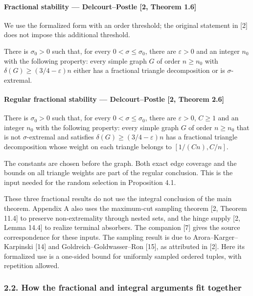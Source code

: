 \documentclass[english,11pt,a4paper]{article}
\begin{document}
\paragraph{Fractional stability --- Delcourt--Postle {[}2, Theorem 1.6{]}}\label{fractional-stability-delcourtpostle-2-theorem-1.6}

We use the formalized form with an order threshold; the original statement in {[}2{]} does not impose this additional threshold.

There is \(\sigma_0>0\) such that, for every \(0<\sigma\le\sigma_0\), there are \(\varepsilon>0\) and an integer \(n_0\) with the following property: every simple graph \(G\) of order \(n\ge n_0\) with \(\delta(G)\ge(3/4-\varepsilon)n\) either has a fractional triangle decomposition or is \(\sigma\)-extremal.

\paragraph{Regular fractional stability --- Delcourt--Postle {[}2, Theorem 2.6{]}}\label{regular-fractional-stability-delcourtpostle-2-theorem-2.6}

There is \(\sigma_0>0\) such that, for every \(0<\sigma\le\sigma_0\), there are \(\varepsilon>0\), \(C\ge1\) and an integer \(n_0\) with the following property: every simple graph \(G\) of order \(n\ge n_0\) that is not \(\sigma\)-extremal and satisfies \(\delta(G)\ge(3/4-\varepsilon)n\) has a fractional triangle decomposition whose weight on each triangle belongs to \([1/(Cn),C/n]\).

The constants are chosen before the graph. Both exact edge coverage and the bounds on all triangle weights are part of the regular conclusion. This is the input needed for the random selection in Proposition 4.1.

These three fractional results do not use the integral conclusion of the main theorem. Appendix A also uses the maximum-cut sampling theorem {[}2, Theorem 11.4{]} to preserve non-extremality through nested sets, and the hinge supply {[}2, Lemma 14.4{]} to realize terminal absorbers. The companion {[}7{]} gives the source correspondence for these inputs. The sampling result is due to Arora--Karger--Karpinski {[}14{]} and Goldreich--Goldwasser--Ron {[}15{]}, as attributed in {[}2{]}. Here its formalized use is a one-sided bound for uniformly sampled ordered tuples, with repetition allowed.

\subsubsection{2.2. How the fractional and integral arguments fit together}\label{how-the-fractional-and-integral-arguments-fit-together}
\end{document}
